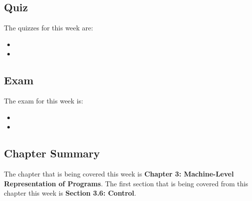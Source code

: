 \subsection{Quiz}

The quizzes for this week are:

\begin{itemize}
    \item {}
    \item {}
\end{itemize}

\subsection{Exam}

The exam for this week is:

\begin{itemize}
    \item {}
    \item {}
\end{itemize}

\newpage

\subsection{Chapter Summary}

The chapter that is being covered this week is \textbf{Chapter 3: Machine-Level Representation of Programs}. The first section that is being covered from this chapter this week is \textbf{Section 3.6: Control}.

